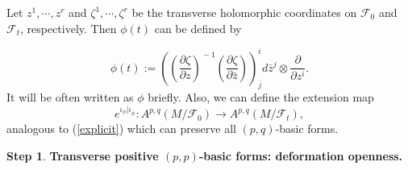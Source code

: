 \documentclass[12pt]{amsart}
\numberwithin{equation}{section}
\theoremstyle{definition}
\newtheorem{step}{Step}
\theoremstyle{definition}
\theoremstyle{definition}
\renewcommand{\1}{\mathsf{1}}
\newcommand{\lk}{\left(}
\newcommand{\rk}{\right)}
\renewcommand{\>}{\rightarrow}
\newcommand{\p}{\partial}
\def\p{\partial}
\def\mc{\mathcal}
\theoremstyle{plain} %
\theoremstyle{plain} %
\theoremstyle{plain} %
\begin{document}
Let $z^1,\cdots,z^r$ and $\zeta^1,\cdots,\zeta^r$ be the transverse holomorphic coordinates on $\mc F_0$ and $\mc F_t$, respectively. Then  $\phi(t)$ can be defined by
	
	\begin{equation}\label{kappa local}
		\phi(t):=\lk \lk \frac{\p \zeta}{\p z} \rk^{\!\!\!-1} \lk \frac{\p \zeta}{\p \bar{z}} \rk
		\rk^i_{\overline{j}}d\bar z^j\otimes\frac{\p}{\p z^i}.
	\end{equation}
	It will be often written as $\phi$ briefly.
	Also, we can define the extension map $$\label{RZ foliation}
	e^{\iota_{\phi}|\iota_{\overline{\phi}}}:
	A^{p,q}(M/\mc F_0)\longrightarrow A^{p,q}(M/\mc F_t),
	$$ analogous to (\ref{explicit}) which can preserve all $(p,q)$-basic forms.
	
	
	
	\begin{step}\label{foliation step 2}
		{\rm\textbf{Transverse  positive $(p,p)$-basic forms: deformation openness.}}\end{step}
	
\end{document}
